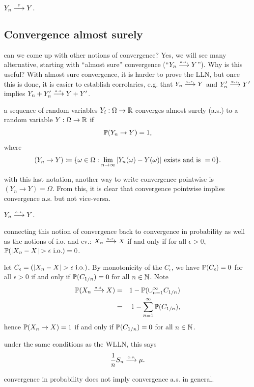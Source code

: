 \documentclass{article}
\begin{document}
 $Y_n \pcv Y$.


\subsection{Convergence almost surely}

 can we come up with other notions of convergence? Yes, we will see many alternative, starting with ``almost sure'' convergence (``$Y_n \ascv Y$''). Why is this useful? With almost sure convergence, it is harder to prove the LLN, but once this is done, it is easier to establish corrolaries, e.g. that $Y_n \ascv Y$ and $Y'_n \ascv Y'$ implies $Y_n + Y'_n \ascv Y + Y'$.

 a sequence of random variables $Y_i : \Omega \to \R$ converges almost surely (a.s.) to a random variable $Y: \Omega \to \R$ if \[ \P(Y_n \to Y) = 1,\] where \[ (Y_n \to Y) \defeq \{ \omega \in\Omega : \lim_{n\to\infty} |Y_n(\omega) - Y(\omega)|\text{ exists and is }=0\}. \]

 with this last notation, another way to write convergence pointwise is $(Y_n \to Y) = \Omega$. From this, it is clear that convergence pointwise implies convergence a.s. but not vice-versa.

 $Y_n \ascv Y$.

 connecting this notion of convergence back to convergence in probability as well as the notions of i.o. and ev.: $X_n \ascv X$ if and only if for all $\epsilon > 0$, $\P(|X_n - X| > \epsilon\io) = 0$.

 let $C_\epsilon = (|X_n - X| > \epsilon\io)$. By monotonicity of the $C_\epsilon$, we have $\P(C_\epsilon) = 0$ for all $\epsilon > 0$ if and only if $\P(C_{1/n}) = 0$ for all $n \in \N$.  Note 
\begin{eqnarray*}
\P(X_n \ascv X) &=& 1 - \P(\cup_{n=1}^\infty C_{1/n} ) \\
&=& 1 - \sum_{n=1}^\infty \P(C_{1/n}),
\end{eqnarray*} 
hence $\P(X_n \to X) = 1$ if and only if $\P(C_{1/n}) = 0$ for all $n \in \N$. 

 under the same conditions as the WLLN, this says \[ \frac{1}{n} S_n \ascv \mu. \]

 convergence in probability does not imply convergence a.s. in general.
\end{document}
